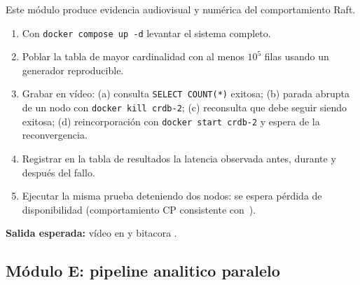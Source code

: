 \documentclass[11pt,a4paper]{article}
\begin{document}
    Este módulo produce evidencia audiovisual y numérica del comportamiento Raft.
    \begin{enumerate}
        \item Con \texttt{docker compose up -d} levantar el sistema completo.
        \item Poblar la tabla de mayor cardinalidad con al menos $10^5$ filas usando un generador reproducible.
        \item Grabar en vídeo: (a) consulta \texttt{SELECT COUNT(*)} exitosa; (b) parada abrupta de un nodo con \texttt{docker kill crdb-2}; (c) reconsulta que debe seguir siendo exitosa; (d) reincorporación con \texttt{docker start crdb-2} y espera de la reconvergencia.
        \item Registrar en la tabla de resultados la latencia observada antes, durante y después del fallo.
        \item Ejecutar la misma prueba deteniendo dos nodos: se espera pérdida de disponibilidad (comportamiento CP consistente con~\cite{Taft2020CockroachDB}).
    \end{enumerate}
    \textbf{Salida esperada:} vídeo en  y bitacora .

\subsection{Módulo E: pipeline analitico paralelo}
\end{document}
